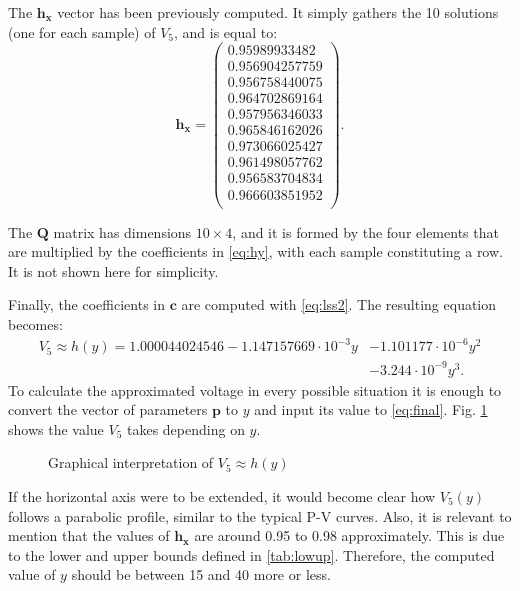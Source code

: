 The $\mathbf{h_x}$ vector has been previously computed. It simply gathers the 10 solutions (one for each sample) of $V_5$, and is equal to:
\begin{equation}
  \mathbf{h_x} = \begin{pmatrix}
0.95989933482 \\
0.956904257759 \\
0.956758440075 \\
0.964702869164 \\
0.957956346033 \\
0.965846162026 \\
0.973066025427 \\
0.961498057762 \\
0.956583704834 \\
0.966603851952 \\
  \end{pmatrix}.
  \label{eq:vech}
\end{equation}

The $\mathbf{Q}$ matrix has dimensions $10 \times 4$, and it is formed by the four elements that are multiplied by the coefficients in \eqref{eq:hy}, with each sample constituting a row. It is not shown here for simplicity. 

Finally, the coefficients in $\mathbf{c}$ are computed with \eqref{eq:lss2}. The resulting equation becomes:
\begin{equation}
  \boxed{
    \begin{split}
      V_5 \approx h(y) = 1.000044024546 -1.147157669\cdot 10^{-3} y & -1.101177\cdot 10^{-6} y^2 \\ & -3.244\cdot 10^{-9} y^3.
\end{split}
}
  \label{eq:final}
\end{equation}
To calculate the approximated voltage in every possible situation it is enough to convert the vector of parameters $\mathbf{p}$ to $y$ and input its value to \eqref{eq:final}. Fig. \ref{fig:V5y} shows the value $V_5$ takes depending on $y$. 

\begin{figure}[!htb] \centering
{}
\caption{Graphical interpretation of $V_5 \approx h(y)$}
\label{fig:V5y}
\end{figure}
If the horizontal axis were to be extended, it would become clear how $V_5(y)$ follows a parabolic profile, similar to the typical P-V curves. Also, it is relevant to mention that the values of $\mathbf{h_x}$ are around 0.95 to 0.98 approximately. This is due to the lower and upper bounds defined in \ref{tab:lowup}. Therefore, the computed value of $y$ should be between 15 and 40 more or less.

